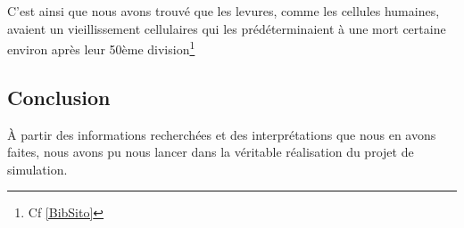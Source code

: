   C'est ainsi que nous avons trouvé que les levures, comme les cellules humaines, avaient un vieillissement cellulaires qui les prédéterminaient à une mort certaine environ après leur 50ème division\footnote{Cf \ref{BibSito}}
  
\subsection{Conclusion}
  À partir des informations recherchées et des interprétations que nous en avons faites, nous avons pu nous lancer dans la véritable réalisation du projet de simulation.
